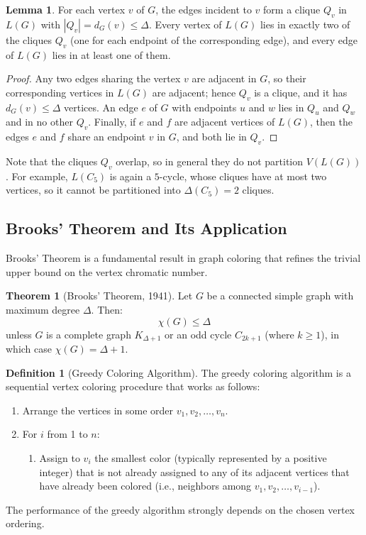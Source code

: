 \documentclass{article}
\theoremstyle{definition}
\newtheorem{theorem}{Theorem}
\newtheorem{lemma}{Lemma}
\newtheorem{definition}{Definition}
\begin{document}
\begin{lemma}
For each vertex $v$ of $G$, the edges incident to $v$ form a clique $Q_v$ in $L(G)$ with $|Q_v| = d_G(v) \leq \Delta$. Every vertex of $L(G)$ lies in exactly two of the cliques $Q_v$ (one for each endpoint of the corresponding edge), and every edge of $L(G)$ lies in at least one of them.
\end{lemma}

\begin{proof}
Any two edges sharing the vertex $v$ are adjacent in $G$, so their corresponding vertices in $L(G)$ are adjacent; hence $Q_v$ is a clique, and it has $d_G(v) \leq \Delta$ vertices. An edge $e$ of $G$ with endpoints $u$ and $w$ lies in $Q_u$ and $Q_w$ and in no other $Q_v$. Finally, if $e$ and $f$ are adjacent vertices of $L(G)$, then the edges $e$ and $f$ share an endpoint $v$ in $G$, and both lie in $Q_v$.
\end{proof}

Note that the cliques $Q_v$ overlap, so in general they do not partition $V(L(G))$. For example, $L(C_5)$ is again a $5$-cycle, whose cliques have at most two vertices, so it cannot be partitioned into $\Delta(C_5) = 2$ cliques.

\subsection* {Brooks' Theorem and Its Application}

Brooks' Theorem is a fundamental result in graph coloring that refines the trivial upper bound on the vertex chromatic number.

\begin{theorem}[Brooks' Theorem, 1941]
Let $G$ be a connected simple graph with maximum degree $\Delta$. Then:
\begin{equation}
\chi(G) \leq \Delta
\end{equation}
unless $G$ is a complete graph $K_{\Delta+1}$ or an odd cycle $C_{2k+1}$ (where $k \geq 1$), in which case $\chi(G) = \Delta + 1$.
\end{theorem}

\begin{definition}[Greedy Coloring Algorithm]
The greedy coloring algorithm is a sequential vertex coloring procedure that works as follows:
\begin{enumerate}
    \item Arrange the vertices in some order $v_1, v_2, \ldots, v_n$.
    \item For $i$ from 1 to $n$:
    \begin{enumerate}
        \item Assign to $v_i$ the smallest color (typically represented by a positive integer) that is not already assigned to any of its adjacent vertices that have already been colored (i.e., neighbors among $v_1, v_2, \ldots, v_{i-1}$).
    \end{enumerate}
\end{enumerate}
The performance of the greedy algorithm strongly depends on the chosen vertex ordering.
\end{definition}
\end{document}
